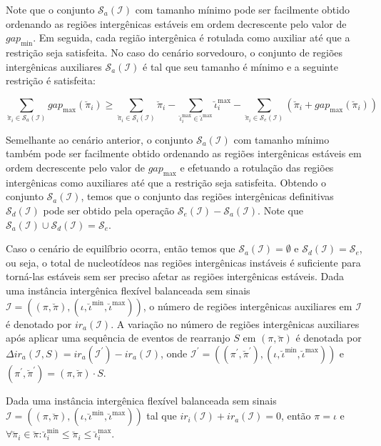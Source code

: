Note que o conjunto $\mathcal{S}_{a}(\mathcal{I})$ com tamanho mínimo pode ser facilmente obtido ordenando as regiões intergênicas estáveis em ordem decrescente pelo valor de $gap_{\min}$. Em seguida, cada região intergênica é rotulada como auxiliar até que a restrição seja satisfeita. No caso do cenário sorvedouro, o conjunto de regiões intergênicas auxiliares $\mathcal{S}_{a}(\mathcal{I})$ é tal que seu tamanho é mínimo e a seguinte restrição é satisfeita:

$$\sum_{\breve\pi_i \in \mathcal{S}_{a}(\mathcal{I})} gap_{\max}(\breve\pi_i) \ge \sum_{\breve\pi_i \in \mathcal{S}_{i}(\mathcal{I})} \breve\pi_i - \sum_{\breve\iota_{i}^{\max}  \in \breve\iota^{\max}} \breve\iota_{i}^{\max} - \sum_{\breve\pi_i \in \mathcal{S}_{e}(\mathcal{I})} (\breve\pi_i + gap_{\max}(\breve\pi_i))$$

Semelhante ao cenário anterior, o conjunto $\mathcal{S}_{a}(\mathcal{I})$ com tamanho mínimo também pode ser facilmente obtido ordenando as regiões intergênicas estáveis em ordem decrescente pelo valor de $gap_{\max}$ e efetuando a rotulação das regiões intergênicas como auxiliares até que a restrição seja satisfeita. Obtendo o conjunto $\mathcal{S}_{a}(\mathcal{I})$, temos que o conjunto das regiões intergênicas definitivas $\mathcal{S}_{d}(\mathcal{I})$ pode ser obtido pela operação $\mathcal{S}_{e}(\mathcal{I}) - \mathcal{S}_{a}(\mathcal{I})$. Note que $\mathcal{S}_{a}(\mathcal{I}) \cup \mathcal{S}_{d}(\mathcal{I}) = \mathcal{S}_{e}$.

Caso o cenário de equilíbrio ocorra, então temos que $\mathcal{S}_{a}(\mathcal{I})=\emptyset$ e $ \mathcal{S}_{d}(\mathcal{I}) = \mathcal{S}_{e}$, ou seja, o total de nucleotídeos nas regiões intergênicas instáveis é suficiente para torná-las estáveis sem ser preciso afetar as regiões intergênicas estáveis. Dada uma instância intergênica flexível balanceada sem sinais $\mathcal{I} = ((\pi,\breve\pi),(\iota,\breve\iota^{\min},\breve\iota^{\max}))$, o número de regiões intergênicas auxiliares em $\mathcal{I}$ é denotado por $ir_a(\mathcal{I})$. A variação no número de regiões intergênicas auxiliares após aplicar uma sequência de eventos de rearranjo $S$ em $(\pi,\breve\pi)$ é denotada por $\Delta ir_a(\mathcal{I},S) = ir_a(\mathcal{I}^{\prime}) - ir_a(\mathcal{I})$, onde $\mathcal{I}^{\prime} = ((\pi^{\prime}, \breve\pi^{\prime}),(\iota,\breve\iota^{\min},\breve\iota^{\max}))$ e $(\pi^{\prime}, \breve\pi^{\prime}) = (\pi, \breve\pi) \cdot S$.

\begin{remark}\label{remark:PGEYZJME}
Dada uma instância intergênica flexível balanceada sem sinais $\mathcal{I} = ((\pi,\breve\pi),(\iota,\breve\iota^{\min},\breve\iota^{\max}))$ tal que $ir_i(\mathcal{I}) + ir_a(\mathcal{I}) = 0$, então $\pi = \iota$ e $\forall \breve\pi_i \in \breve\pi: \breve\iota^{\min}_i \le \breve\pi_i \le \breve\iota^{\max}_i$.
\end{remark}

